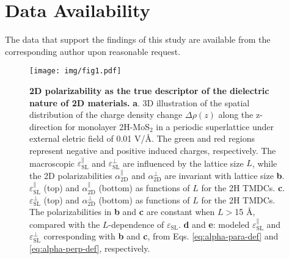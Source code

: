 \documentclass[journal=ancac3,manuscript=article,email=true,hyperref=true,keywords=false]{achemso}
\begin{document}
\section{Data Availability}
The data that support the findings of this study are available from
the corresponding author upon reasonable request.





\label{sec:org34cbe74}
\begin{figure}[H]
\centering
\texttt{[image: img/fig1.pdf]}
\caption{\label{fig-1} \textbf{2D polarizability as the true
    descriptor of the dielectric nature of 2D materials.}
  \textbf{a}. 3D illustration of the spatial distribution of the
  charge density change $\Delta \rho(z)$ along the z-direction for
  monolayer 2H-MoS$_{2}$ in a periodic superlattice under external
  eletric field of 0.01 V/\AA{}.  The green and red regions represent
  negative and positive induced charges, respectively. The macroscopic
  $\varepsilon_{\mathrm{SL}}^{\parallel}$ and
  $\varepsilon_{\mathrm{SL}}^{\perp}$ are influenced by the lattice
  size $L$, while the 2D polarizabilities $\alpha_{\mathrm{2D}}^{\parallel}$ and
  $\alpha_{\mathrm{2D}}^{\perp}$ are invariant with lattice size \textbf{b}.
  $\varepsilon^{\parallel}_{\mathrm{SL}}$ (top) and
  $\alpha_{\mathrm{2D}}^{\parallel}$ (bottom) as functions of $L$ for
  the 2H TMDCs. \textbf{c}.  $\varepsilon^{\perp}_{\mathrm{SL}}$ (top)
  and $\alpha_{\mathrm{2D}}^{\perp}$ (bottom) as functions of $L$ for
  the 2H TMDCs. The polarizabilities in \textbf{b} and \textbf{c} are
  constant when $L>$15 \AA{}, compared with the $L$-dependence of
  $\varepsilon_{\mathrm{SL}}$. \textbf{d} and \textbf{e}: modeled
  $\varepsilon_{\mathrm{SL}}^{\parallel}$ and
  $\varepsilon_{\mathrm{SL}}^{\perp}$ corresponding with \textbf{b}
  and \textbf{c}, from Eqs. \ref{eq:alpha-para-def} and
  \ref{eq:alpha-perp-def}, respectively.
}
\end{figure}
\end{document}
